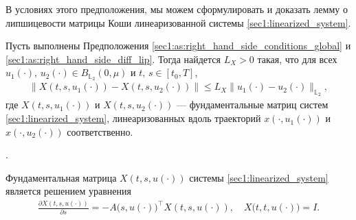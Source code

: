 \documentclass[../main.tex]{subfiles}
\begin{document}
В условиях этого предположения, мы можем сформулировать и доказать лемму о липшицевости матрицы Коши линеаризованной системы \eqref{sec1:linearized_system}.
\begin{lemma}\label{sec1:lem:lip_fundumental_matrix}
    Пусть выполнены Предположения \ref{sec1:as:right_hand_side_conditions_global} и \ref{sec1:as:right_hand_side_diff_lip}.
    Тогда найдется $L_X > 0 $ такая, что для всех $u_1(\cdot),\, u_2(\cdot) \in B_{\mathbb{L}_2}(0,\mu)$ и $t, \, s  \in [t_0,T]$, 
    \begin{gather*}
        \Big\|X(t,s,u_1(\cdot)) - X(t,s,u_2(\cdot)) \Big\| \leqslant L_X \| u_1(\cdot) - u_2(\cdot) \|_{\mathbb{L}_2},
    \end{gather*}
    где $X(t,s,u_1(\cdot)) $ и $X(t,s,u_2(\cdot)) $ --- фундаментальные матриц систем \eqref{sec1:linearized_system}, линеаризованных вдоль траекторий $x(\cdot, u_1(\cdot)) $ и $x(\cdot, u_2(\cdot)) $ соответственно. 
\end{lemma}
\doc.
        
Фундаментальная матрица $X(t,s,u(\cdot)) $  системы \eqref{sec1:linearized_system} является решением уравнения
\begin{gather*}
    \frac{\partial X(t, s, u(\cdot))}{\partial s} = -A\big(s,u(\cdot)\big)^{\top} X(t, s, u(\cdot)), \quad X\big(t, t, u(\cdot)\big) = I.
\end{gather*}
        
\end{document}
